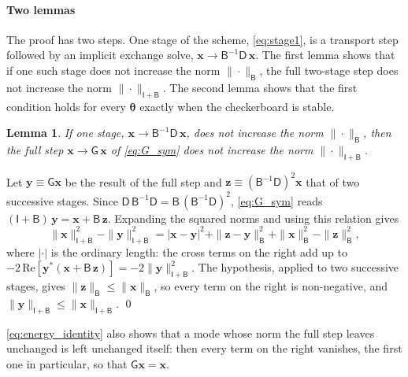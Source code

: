\documentclass[preprint,12pt,authoryear]{elsarticle}
\newcommand{\tenI}{\mathsf{I}}
\newcommand{\tenG}{\mathsf{G}}
\providecommand{\tenD}{\mathsf{D}}
\providecommand{\tenB}{\mathsf{B}}
\newtheorem{lem}{Lemma}
\begin{document}
\begin{appendix}
\paragraph{Two lemmas} The proof has two steps. One stage of the scheme, \autoref{eq:stage1}, is a transport step followed by an implicit exchange solve, $\mathbf{x} \to \tenB^{-1}\tenD\,\mathbf{x}$. The first lemma shows that if one such stage does not increase the norm $\|\cdot\|_{\tenB}$, the full two-stage step does not increase the norm $\|\cdot\|_{\tenI + \tenB}$. The second lemma shows that the first condition holds for every $\boldsymbol{\theta}$ exactly when the checkerboard is stable.

\begin{lem}
\label{lem:two_stage}
If one stage, $\mathbf{x} \to \tenB^{-1}\tenD\,\mathbf{x}$, does not increase the norm $\|\cdot\|_{\tenB}$, then the full step $\mathbf{x} \to \tenG\,\mathbf{x}$ of \autoref{eq:G_sym} does not increase the norm $\|\cdot\|_{\tenI + \tenB}$.
\end{lem}

\begin{pf}
Let $\mathbf{y} \equiv \tenG\mathbf{x}$ be the result of the full step and $\mathbf{z} \equiv (\tenB^{-1}\tenD)^2\mathbf{x}$ that of two successive stages. Since $\tenD\,\tenB^{-1}\tenD = \tenB\,(\tenB^{-1}\tenD)^2$, \autoref{eq:G_sym} reads $(\tenI + \tenB)\,\mathbf{y} = \mathbf{x} + \tenB\,\mathbf{z}$. Expanding the squared norms and using this relation gives
\begin{equation}
    \|\mathbf{x}\|_{\tenI + \tenB}^2 - \|\mathbf{y}\|_{\tenI + \tenB}^2 = |\mathbf{x} - \mathbf{y}|^2 + \|\mathbf{z} - \mathbf{y}\|_{\tenB}^2 + \|\mathbf{x}\|_{\tenB}^2 - \|\mathbf{z}\|_{\tenB}^2 ,
    \label{eq:energy_identity}
\end{equation}
where $|\cdot|$ is the ordinary length: the cross terms on the right add up to $-2\,\mathrm{Re}[\mathbf{y}^*(\mathbf{x} + \tenB\,\mathbf{z})] = -2\|\mathbf{y}\|_{\tenI + \tenB}^2$. The hypothesis, applied to two successive stages, gives $\|\mathbf{z}\|_{\tenB} \leq \|\mathbf{x}\|_{\tenB}$, so every term on the right is non-negative, and $\|\mathbf{y}\|_{\tenI + \tenB} \leq \|\mathbf{x}\|_{\tenI + \tenB}$. \qed
\end{pf}

\autoref{eq:energy_identity} also shows that a mode whose norm the full step leaves unchanged is left unchanged itself: then every term on the right vanishes, the first one in particular, so that $\tenG\mathbf{x} = \mathbf{x}$.


\end{appendix}
\end{document}
